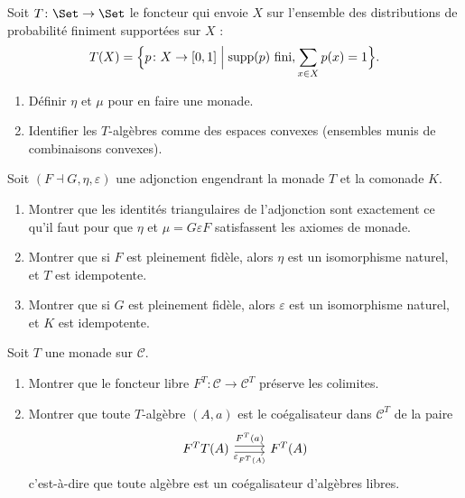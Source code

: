 \begin{exercice}\label{exo:monade-distribution}
Soit $T \colon \Set \to \Set$ le foncteur qui envoie $X$ sur l'ensemble
des distributions de probabilité finiment supportées sur $X$ :
\[
    T(X) = \Bigl\{ p \colon X \to [0,1] \;\Big|\;
    \mathrm{supp}(p) \text{ fini}, \sum_{x \in X} p(x) = 1 \Bigr\}.
\]
\begin{enumerate}[label=(\alph*)]
\item Définir $\eta$ et $\mu$ pour en faire une monade.
\item Identifier les $T$-algèbres comme des espaces convexes
    (ensembles munis de combinaisons convexes).
\end{enumerate}
\end{exercice}

\begin{exercice}\label{exo:adjonction-monade-aller-retour}
Soit $(F \dashv G, \eta, \varepsilon)$ une adjonction engendrant
la monade $T$ et la comonade $K$.
\begin{enumerate}[label=(\alph*)]
\item Montrer que les identités triangulaires de l'adjonction sont
    exactement ce qu'il faut pour que $\eta$ et $\mu = G\varepsilon F$
    satisfassent les axiomes de monade.
\item Montrer que si $F$ est pleinement fidèle, alors
    $\eta$ est un isomorphisme naturel, et $T$ est idempotente.
\item Montrer que si $G$ est pleinement fidèle, alors
    $\varepsilon$ est un isomorphisme naturel, et $K$ est idempotente.
\end{enumerate}
\end{exercice}

\begin{exercice}\label{exo:algebres-libres-colimites}
Soit $T$ une monade sur $\mathcal{C}$.
\begin{enumerate}[label=(\alph*)]
\item Montrer que le foncteur libre $F^T \colon \mathcal{C} \to \mathcal{C}^T$
    préserve les colimites.
\item Montrer que toute $T$-algèbre $(A, a)$ est le coégalisateur dans
    $\mathcal{C}^T$ de la paire
    \[
    \begin{tikzcd}
    F^T T(A) \arrow[r, shift left, "F^T(a)"]
    \arrow[r, shift right, "\varepsilon_{F^T(A)}"'] & F^T(A)
    \end{tikzcd}
    \]
    c'est-à-dire que toute algèbre est un coégalisateur d'algèbres libres.
\end{enumerate}
\end{exercice}

